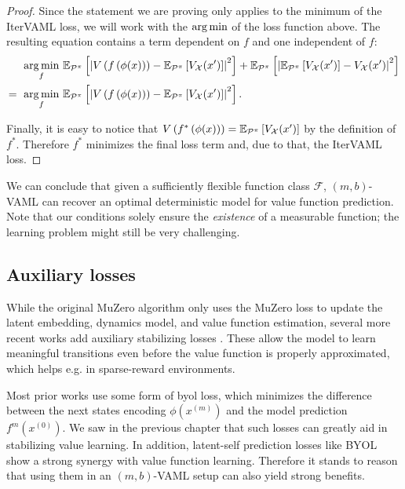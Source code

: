 \begin{proof}
Since the statement we are proving only applies to the minimum of the IterVAML loss, we will work with the $\operatorname*{arg\,min}$ of the loss function above.
The resulting equation contains a term dependent on $f$ and one independent of $f$:
\begin{align}
    \operatorname*{arg\,min}_f~ & \mathbb{E}_{\mathcal{P}^\pi}\left[  \left|{V\left( f\left( \phi(x) \right) \right) - \mathbb{E}_{\mathcal{P}^\pi}\left[  V_\mathcal{X}(x') \right]}\right|^2 \right] + \mathbb{E}_{\mathcal{P}^\pi}\left[  \left|{\mathbb{E}_{\mathcal{P}^\pi}\left[  V_\mathcal{X}(x') \right] - V_\mathcal{X}(x') }\right|^2 \right]\\
    =~ \operatorname*{arg\,min}_f~ & \mathbb{E}_{\mathcal{P}^\pi}\left[  \left|{V\left( f\left( \phi(x) \right) \right) - \mathbb{E}_{\mathcal{P}^\pi}\left[  V_\mathcal{X}(x') \right]}\right|^2 \right].
\end{align}

Finally, it is easy to notice that $V\left( f^*\left( \phi(x) \right) \right) = \mathbb{E}_{\mathcal{P}^\pi}\left[  V_\mathcal{X}(x') \right]$ by the definition of $f^*$.
Therefore $f^*$ minimizes the final loss term and, due to that, the IterVAML loss.

\end{proof}

We can conclude that given a sufficiently flexible function class $\mathcal{F}$, $(m,b)$-VAML can recover an optimal deterministic model for value function prediction.
Note that our conditions solely ensure the \emph{existence} of a measurable function; the learning problem might still be very challenging.

\subsection{Auxiliary losses}

While the original MuZero algorithm only uses the MuZero loss to update the latent embedding, dynamics model, and value function estimation, several more recent works add auxiliary stabilizing losses \parencite{ye2021mastering,hafner2021mastering,hansen2024tdmpc,voelcker2025mad}.
These allow the model to learn meaningful transitions even before the value function is properly approximated, which helps e.g. in sparse-reward environments.

Most prior works use some form of \ac{byol} \parencite{grill2020bootstrap} loss, which minimizes the difference between the next states encoding $\phi(x^{(m)})$ and the model prediction $f^m(x^{(0)})$.
We saw in the previous chapter that such losses can greatly aid in stabilizing value learning.
In addition, latent-self prediction losses like BYOL show a strong synergy with value function learning.
Therefore it stands to reason that using them in an $(m,b)$-VAML setup can also yield strong benefits.

